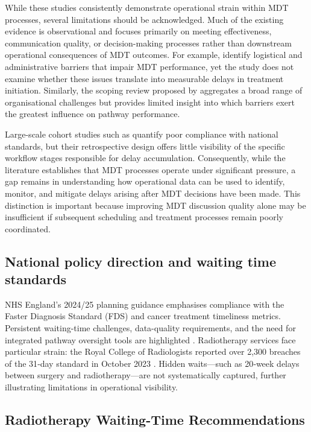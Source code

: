 While these studies consistently demonstrate operational strain within MDT processes, several limitations should be acknowledged. Much of the existing evidence is observational and focuses primarily on meeting effectiveness, communication quality, or decision-making processes rather than downstream operational consequences of MDT outcomes. For example, \cite{soukup2022} identify logistical and administrative barriers that impair MDT performance, yet the study does not examine whether these issues translate into measurable delays in treatment initiation. Similarly, the scoping review proposed by \cite{law2024} aggregates a broad range of organisational challenges but provides limited insight into which barriers exert the greatest influence on pathway performance.   

Large-scale cohort studies such as \cite{lim2025} quantify poor compliance with national standards, but their retrospective design offers little visibility of the specific workflow stages responsible for delay accumulation. Consequently, while the literature establishes that MDT processes operate under significant pressure, a gap remains in understanding how operational data can be used to identify, monitor, and mitigate delays arising after MDT decisions have been made. This distinction is important because improving MDT discussion quality alone may be insufficient if subsequent scheduling and treatment processes remain poorly coordinated.

\subsection{National policy direction and waiting time standards}

NHS England's 2024/25 planning guidance emphasises compliance with the Faster Diagnosis Standard (FDS) and cancer treatment timeliness metrics. Persistent waiting-time challenges, data-quality requirements, and the need for integrated pathway oversight tools are highlighted \citep{parker2026}. Radiotherapy services face particular strain: the Royal College of Radiologists reported over 2,300 breaches of the 31‑day standard in October 2023 \citep{rcr2024}. Hidden waits—such as 20‑week delays between surgery and radiotherapy—are not systematically captured, further illustrating limitations in operational visibility.

\subsection{Radiotherapy Waiting-Time Recommendations}

